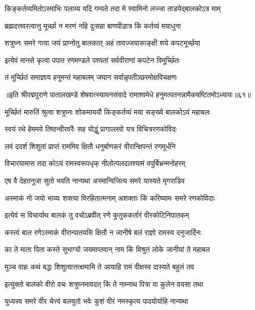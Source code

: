 \twolineshloka
{किङ्कर्तव्यमितोऽस्माभिः पलाय्य यदि गम्यते}
{तदा मे स्वामिनो लज्जा ताडयेद्बालकोऽत्र माम्}%

\twolineshloka
{ब्रह्मदत्तवरत्वात्तु मूर्च्छा न मरणं नहि}
{दुःसहा बाणपीडात्र किं कर्तव्यं मयाधुना}%

\twolineshloka
{शत्रुघ्नः समरे गत्वा जयं प्राप्नोतु बालकात्}
{अहं तावज्जयाकाङ्क्षी शये कपटमूर्च्छया}%

\twolineshloka
{इत्येवं मानसे कृत्वा पपात रणमण्डले}
{पश्यतां सर्ववीराणां कपटेन विमूर्च्छितः}%

\twolineshloka
{तं मूर्च्छितं समाज्ञाय हनूमन्तं महाबलम्}
{जघान सर्वान्नृपतीञ्छरमोक्षविचक्षणः}%

॥इति श्रीपद्मपुराणे पातालखण्डे शेषवात्स्यायनसंवादे रामाश्वमेधे हनुमत्पतनन्नामैकषष्टितमोऽध्यायः॥६१॥



\twolineshloka
{मूर्च्छितं मारुतिं श्रुत्वा शत्रुघ्नः शोकमाययौ}
{किङ्कर्तव्यं मया सङ्ख्ये बालकोऽयं महाबलः}%

\twolineshloka
{स्वयं रथे हेममये तिष्ठन्वीरवरैः सह}
{योद्धुं प्रागाल्लवो यत्र विचित्ररणकोविदः}%

\twolineshloka
{लवं ददर्श शिशुतां प्राप्तं राममिव क्षितौ}
{धनुर्बाणकरं वीरान्क्षिपन्तं रणमूर्धनि}%

\twolineshloka
{विचारयामास तदा कोऽयं रामस्वरूपधृक्}
{नीलोत्पलदलश्यामं वपुर्बिभ्रन्मनोहरम्}%

\twolineshloka
{एष वै देहतनुजा सुतो भवति नान्यथा}
{अस्मान्विजित्य समरे यास्यते मृगराडिव}%

\twolineshloka
{अस्माकं नो जयो भाव्यः शक्त्या विरहितात्मनाम्}
{अशक्ताः किं करिष्यामः समरे रणकोविदाः}%

\twolineshloka
{इत्येवं स विचार्याथ बालकं तु वचोऽब्रवीत्}
{रणे कुतुककर्तारं वीरकोटिनिपातकम्}%

\twolineshloka
{कस्त्वं बाल रणेऽस्माकं वीरान्पातयसि क्षितौ}
{न जानीषे बलं राज्ञो रामस्य दनुजार्दिनः}%

\twolineshloka
{का ते माता पिता कस्ते सुभाग्यो जयमाप्तवान्}
{नाम किं विश्रुतं लोके जानीयां ते महाबल}%

\twolineshloka
{मुञ्च वाहः कथं बद्धः शिशुत्वात्तत्क्षमामि ते}
{आयाहि रामं वीक्षस्व दास्यते बहुलं तव}%

\twolineshloka
{इत्युक्तो बालको वीरो वचः शत्रुघ्नमावदत्}
{किं ते नाम्नाथ पित्रा वा कुलेन वयसा तथा}%

\twolineshloka
{युध्यस्व समरे वीर चेत्त्वं बलयुतो भवेः}
{कुशं वीरं नमस्कृत्य पादयोर्याहि नान्यथा}%

